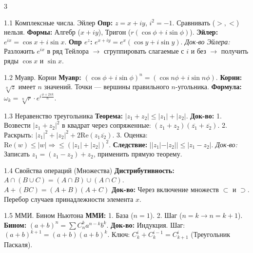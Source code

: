 \documentclass[8pt, a4paper, landscape]{extarticle}
\newcommand{\Ra}{\Rightarrow}
\begin{document}
\begin{multicols*}{3} %


\begin{ticket}{1.1 Комплексные числа. Эйлер}
\textbf{Опр:} $z = x+iy$, $i^2=-1$. Сравнивать ($>, <$) нельзя.
\textbf{Формы:} Алгебр ($x+iy$), Тригон ($r(\cos\phi + i\sin\phi)$).
\textbf{Эйлер:} $e^{ix} = \cos x + i\sin x$.
\textbf{Опр $e^z$:} $e^{x+iy} = e^x(\cos y + i\sin y)$.
\textit{Док-во Эйлера:} Разложить $e^{ix}$ в ряд Тейлора $\to$ сгруппировать слагаемые с $i$ и без $\to$ получить ряды $\cos x$ и $\sin x$.
\end{ticket}

\begin{ticket}{1.2 Муавр. Корни}
\textbf{Муавр:} $(\cos \phi + i\sin \phi)^n = (\cos n\phi + i\sin n\phi)$.
\textbf{Корни:} $\sqrt[n]{z}$ имеет $n$ значений. Точки — вершины правильного $n$-угольника.
\textbf{Формула:} $\omega_k = \sqrt[n]{r} \cdot e^{i \frac{\phi + 2\pi k}{n}}$.
\end{ticket}

\begin{ticket}{1.3 Неравенство треугольника}
\textbf{Теорема:} $|z_1 + z_2| \le |z_1| + |z_2|$.
\textbf{Док-во:}
1. Возвести $|z_1+z_2|^2$ в квадрат через сопряженные: $(z_1+z_2)(\overline{z_1}+\overline{z_2})$.
2. Раскрыть: $|z_1|^2 + |z_2|^2 + 2\text{Re}(z_1\overline{z_2})$.
3. Оценка: $\text{Re}(w) \le |w| \Ra \le (|z_1|+|z_2|)^2$.
\textbf{Следствие:} $||z_1| - |z_2|| \le |z_1 - z_2|$.
\textit{Док-во:} Записать $z_1 = (z_1-z_2) + z_2$, применить прямую теорему.
\end{ticket}

\begin{ticket}{1.4 Свойства операций (Множества)}
\textbf{Дистрибутивность:} $A \cap (B \cup C) = (A \cap B) \cup (A \cap C)$.\\
$A + (BC) = (A + B)(A + C)$
\textbf{Док-во:} Через включение множеств $\subset$ и $\supset$. Перебор случаев принадлежности элемента $x$.
\end{ticket}

\begin{ticket}{1.5 ММИ. Бином Ньютона}
\textbf{ММИ:} 1. База ($n=1$). 2. Шаг ($n=k \to n=k+1$).
\textbf{Бином:} $(a+b)^n = \sum C_n^k a^{n-k}b^k$.
\textbf{Док-во:} Индукция.
Шаг: $(a+b)^{k+1} = (a+b)(a+b)^k$.
Ключ: $C_k^i + C_k^{i-1} = C_{k+1}^i$ (Треугольник Паскаля).
\end{ticket}


\end{multicols*}
\end{document}
